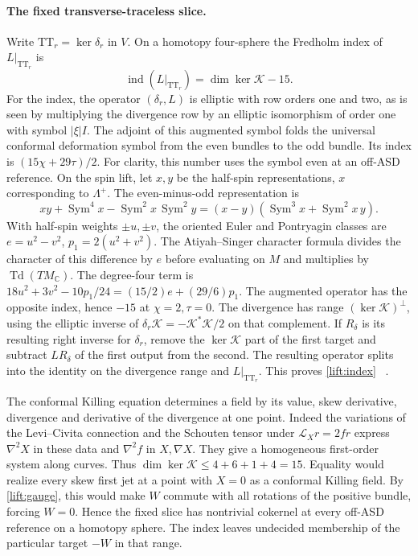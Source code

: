 \documentclass[11pt]{article}
\numberwithin{equation}{section}
\theoremstyle{definition}
\theoremstyle{remark}
\begin{document}
\paragraph{The fixed transverse-traceless slice.}
Write \(\mathrm{TT}_r=\ker\delta_r\) in \(V\). On a homotopy
four-sphere the Fredholm index of \(L|_{\mathrm{TT}_r}\) is
\begin{equation}\label{lift:index}
 \operatorname{ind}(L|_{\mathrm{TT}_r})
     =\dim\ker\mathcal K-15 .
\end{equation}
For the index, the operator \((\delta_r,L)\) is elliptic with row
orders one and two, as is seen by multiplying the divergence row
by an elliptic isomorphism of order one with symbol \(|\xi|I\).
The adjoint of this augmented symbol folds the universal conformal
deformation symbol from the even bundles to the odd bundle. Its
index is \((15\chi+29\tau)/2\). For clarity, this number uses the
symbol even at an off-ASD reference. On the spin lift, let \(x,y\)
be the half-spin representations, \(x\) corresponding to
\(\Lambda^+\). The even-minus-odd representation is
\[
 xy+\operatorname{Sym}^4x-\operatorname{Sym}^2x\,\operatorname{Sym}^2y
 =(x-y)(\operatorname{Sym}^3x+\operatorname{Sym}^2x\,y).
\]
With half-spin weights \(\pm u,\pm v\), the oriented Euler and
Pontryagin classes are \(e=u^2-v^2\), \(p_1=2(u^2+v^2)\).
The Atiyah--Singer character formula divides the character of this
difference by \(e\) before evaluating on \(M\) and multiplies by
\(\operatorname{Td}(TM_{\mathbb C})\). The degree-four term is
\(18u^2+3v^2-10p_1/24=(15/2)e+(29/6)p_1\). The augmented operator
has the opposite index, hence \(-15\) at \(\chi=2,\tau=0\).
The divergence has range \((\ker\mathcal K)^\perp\), using the elliptic
inverse of \(\delta_r\mathcal K=-\mathcal K^*\mathcal K/2\) on that
complement. If \(R_\delta\) is its resulting right inverse for
\(\delta_r\), remove the \(\ker\mathcal K\) part of the first target
and subtract \(LR_\delta\) of the first output from the second.
The resulting operator splits into the identity on the divergence
range and \(L|_{\mathrm{TT}_r}\). This proves \eqref{lift:index}~\cite[Section~2]{AtiyahSinger1968IndexIII}
\cite[Section~1.1]{GoverGursky2024}.

The conformal Killing equation determines a field by its value,
skew derivative, divergence and derivative of the divergence at
one point. Indeed the variations of the Levi--Civita connection
and the Schouten tensor under \(\mathcal L_X r=2fr\) express
\(\nabla^2 X\) in these data and \(\nabla^2 f\) in \(X,\nabla X\).
They give a homogeneous first-order system along curves.
Thus \(\dim\ker\mathcal K\le4+6+1+4=15\). Equality would realize
every skew first jet at a point with \(X=0\) as a conformal Killing
field. By \eqref{lift:gauge}, this would make \(W\) commute with all
rotations of the positive bundle, forcing \(W=0\). Hence the fixed
slice has nontrivial cokernel at every off-ASD reference on a
homotopy sphere. The index leaves undecided membership of the
particular target \(-W\) in that range.
\end{document}
